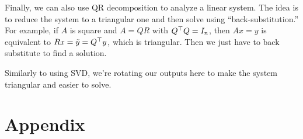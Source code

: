 \documentclass[11 pt]{scrartcl}
\begin{document}
Finally, we can also use QR decomposition to analyze a linear system. 
The idea is to reduce the system to a triangular one and then solve using ``back-substitution.'' 
For example, if $A$ is square and $A = QR$ with $Q^\top Q = I_n$, then $Ax = y$ is equivalent to $Rx = \tilde{y} = Q^\top y$, which is triangular. 
Then we just have to back substitute to find a solution. 

Similarly to using SVD, we're rotating our outputs here to make the system triangular and easier to solve.

\newpage

\section{Appendix}
\renewcommand{\listtheoremname}{List of Definitions and Theorems}
\listoftheorems[ignoreall,show={theorem,definition}]
\end{document}
